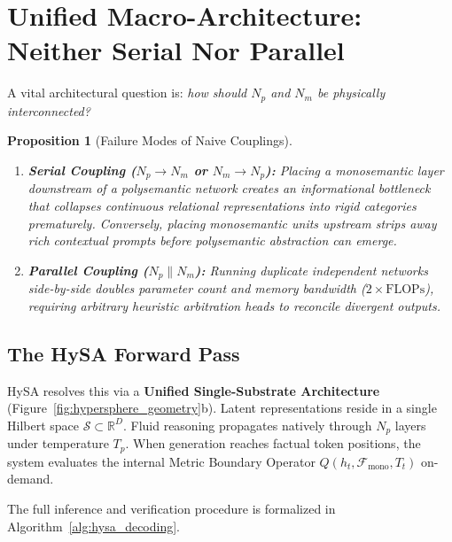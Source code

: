 \documentclass[11pt,a4paper]{article}
\newtheorem{proposition}{Proposition}
\theoremstyle{definition}
\begin{document}
\section{Unified Macro-Architecture: Neither Serial Nor Parallel}

A vital architectural question is: \textit{how should $N_p$ and $N_m$ be physically interconnected?}

\begin{proposition}[Failure Modes of Naive Couplings]
\leavevmode
\begin{enumerate}[leftmargin=*, itemsep=2.0pt]
    \item \textbf{Serial Coupling ($N_p \to N_m$ or $N_m \to N_p$):} Placing a monosemantic layer downstream of a polysemantic network creates an informational bottleneck that collapses continuous relational representations into rigid categories prematurely. Conversely, placing monosemantic units upstream strips away rich contextual prompts before polysemantic abstraction can emerge.
    \item \textbf{Parallel Coupling ($N_p \parallel N_m$):} Running duplicate independent networks side-by-side doubles parameter count and memory bandwidth ($2\times \mathrm{FLOPs}$), requiring arbitrary heuristic arbitration heads to reconcile divergent outputs.
\end{enumerate}
\end{proposition}

\subsection{The HySA Forward Pass}
HySA resolves this via a \textbf{Unified Single-Substrate Architecture} (Figure~\ref{fig:hypersphere_geometry}b). Latent representations reside in a single Hilbert space $\mathcal{S} \subset \mathbb{R}^D$. Fluid reasoning propagates natively through $N_p$ layers under temperature $T_p$. When generation reaches factual token positions, the system evaluates the internal Metric Boundary Operator $Q(h_t, \mathcal{F}_{\mathrm{mono}}, T_t)$ on-demand.

The full inference and verification procedure is formalized in Algorithm~\ref{alg:hysa_decoding}.
\end{document}
